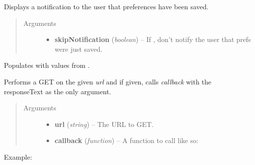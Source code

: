 \documentclass[letterpaper,10pt,openany]{sphinxmanual}
\begin{document}
\begin{fulllineitems}
\begin{fulllineitems}
\begin{fulllineitems}
Displays a notification to the user that preferences have been saved.
\begin{quote}\begin{description}
\item[{Arguments}] \leavevmode\begin{itemize}
\item {} 
\textbf{skipNotification} (\emph{boolean}) -- If , don't notify the user that prefs were just saved.

\end{itemize}

\end{description}\end{quote}

\end{fulllineitems}



\begin{fulllineitems}
\label{Developer/js_gateone:GateOne.Utils.loadPrefs}
Populates {\hyperref[Developer/js_gateone:GateOne.prefs]{}} with values from .

\end{fulllineitems}



\begin{fulllineitems}
\label{Developer/js_gateone:GateOne.Utils.xhrGet}
Performs a GET on the given \emph{url} and if given, calls \emph{callback} with the responseText as the only argument.
\begin{quote}\begin{description}
\item[{Arguments}] \leavevmode\begin{itemize}
\item {} 
\textbf{url} (\emph{string}) -- The URL to GET.

\item {} 
\textbf{callback} (\emph{function}) -- A function to call like so: 

\end{itemize}

\end{description}\end{quote}

Example:


\end{fulllineitems}
\end{fulllineitems}
\end{fulllineitems}
\end{document}
